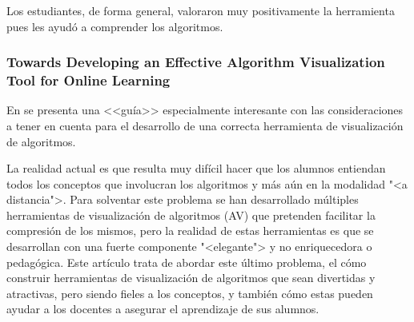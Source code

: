 Los estudiantes, de forma general, valoraron muy positivamente la herramienta
pues les ayudó a comprender los algoritmos.

\subsubsection{Towards Developing an Effective Algorithm Visualization Tool for
Online Learning} 

En \cite{8560314} se presenta una <<guía>> especialmente interesante con las
consideraciones a tener en cuenta para el desarrollo de una correcta herramienta
de visualización de algoritmos.


La realidad actual es que resulta muy difícil hacer que los alumnos entiendan
todos los conceptos que involucran los algoritmos y más aún en la modalidad "<a
distancia">. Para solventar este problema se han desarrollado múltiples
herramientas de visualización de algoritmos (AV) que pretenden facilitar la
compresión de los mismos, pero la realidad de estas herramientas es que se
desarrollan con una fuerte componente "<elegante"> y no enriquecedora o
pedagógica. Este artículo trata de abordar este último problema, el cómo
construir herramientas de visualización de algoritmos que sean divertidas y
atractivas, pero siendo fieles a los conceptos, y también cómo estas pueden
ayudar a los docentes a asegurar el aprendizaje de sus alumnos.

